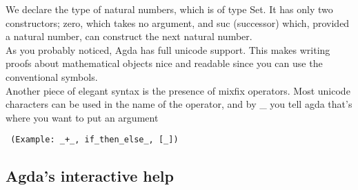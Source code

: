 \documentclass[12pt,twoside,notitlepage]{report}
\begin{document}
We declare the type of natural numbers, which is of type Set. It has only two constructors;
zero, which takes no argument, and suc (successor) which, provided a natural number, can
construct the next natural number.\\

As you probably noticed, Agda has full unicode support. This makes writing proofs
about mathematical objects nice and readable since you can use the conventional symbols. \\

Another piece of elegant syntax is the presence of mixfix operators. Most unicode characters
can be used in the name of the operator, and by \_ you tell agda that's where you want
to put an argument \begin{verbatim} (Example: _+_, if_then_else_, [_])
\end{verbatim}

\subsection{Agda's interactive help}
\end{document}
